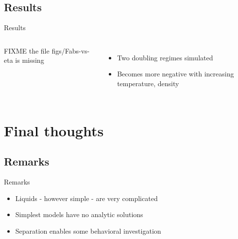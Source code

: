 \documentclass{beamer}
\begin{document}
\subsection*{Results}
\begin{frame}{Results}
\begin{columns}
        FIXME the file figs/Fabs-vs-eta is missing
	\begin{itemize}
		\item Two doubling regimes simulated
		\item Becomes more negative with increasing temperature, density 
	\end{itemize}
\end{columns}
\end{frame}

\section*{Final thoughts}
\subsection*{Remarks}
\begin{frame}{Remarks}
	\begin{itemize}
		\item Liquids - however simple - are very complicated
		\item Simplest models have no analytic solutions
		\item Separation enables some behavioral investigation
	\end{itemize}
\end{frame}
\end{document}
